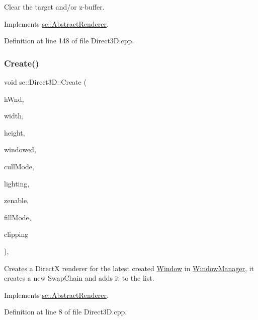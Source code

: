 Clear the target and/or z-\/buffer. 

Implements \mbox{\hyperlink{classse_1_1_abstract_renderer_a2857e7bb3803682f94fb53e305da24e4}{se\+::\+Abstract\+Renderer}}.



Definition at line 148 of file Direct3\+D.\+cpp.

\mbox{\label{classse_1_1_direct3_d_a0174f6e1436fa4171380cc603ca262f0}} 
\subsubsection{\texorpdfstring{Create()}{Create()}}
{\footnotesize\ttfamily void se\+::\+Direct3\+D\+::\+Create (\begin{DoxyParamCaption}\item[{H\+W\+ND}]{h\+Wnd,  }\item[{int}]{width,  }\item[{int}]{height,  }\item[{bool}]{windowed,  }\item[{\mbox{\hyperlink{namespacese_a2447de8e300e86ac4a8893e0486fc3bb}{Cull\+Mode}}}]{cull\+Mode,  }\item[{bool}]{lighting,  }\item[{bool}]{zenable,  }\item[{\mbox{\hyperlink{namespacese_a7ab38efb91dff288cc8279bedd6bc02c}{Fill\+Mode}}}]{fill\+Mode,  }\item[{bool}]{clipping }\end{DoxyParamCaption})\hspace{0.3cm}{\ttfamily [override]}, {\ttfamily [virtual]}}

Creates a DirectX renderer for the latest created \mbox{\hyperlink{classse_1_1_window}{Window}} in \mbox{\hyperlink{classse_1_1_window_manager}{Window\+Manager}}, it creates a new Swap\+Chain and adds it to the list. 

Implements \mbox{\hyperlink{classse_1_1_abstract_renderer_a5c7e19127084d6bee7da63e3838d3c36}{se\+::\+Abstract\+Renderer}}.



Definition at line 8 of file Direct3\+D.\+cpp.

\mbox{\label{classse_1_1_direct3_d_aab3d1a8b4ee8812dea07f5ecda5efc42}} 
